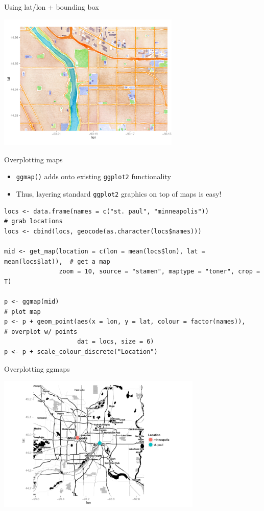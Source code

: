 \documentclass[sans,aspectratio=169,presentation,bigger,fleqn]{beamer}
\begin{document}
\begin{frame}[label=sec-7]{Using lat/lon + bounding box}
\begin{center}
\includegraphics[height=6.5cm]{./plots/ust-coords-box.pdf}
\end{center}
\end{frame}
\begin{frame}[fragile,label=sec-8]{Overplotting maps}
 \begin{itemize}
\item \texttt{ggmap()} adds onto existing \texttt{ggplot2} functionality
\item Thus, layering standard \texttt{ggplot2} graphics on top of maps is easy!
\end{itemize}

\scriptsize
\begin{verbatim}
locs <- data.frame(names = c("st. paul", "minneapolis"))                  # grab locations
locs <- cbind(locs, geocode(as.character(locs$names)))

mid <- get_map(location = c(lon = mean(locs$lon), lat = mean(locs$lat)),  # get a map
               zoom = 10, source = "stamen", maptype = "toner", crop = T)

p <- ggmap(mid)                                                           # plot map
p <- p + geom_point(aes(x = lon, y = lat, colour = factor(names)),        # overplot w/ points
                    dat = locs, size = 6)
p <- p + scale_colour_discrete("Location")
\end{verbatim}

\normalsize
\end{frame}
\begin{frame}[label=sec-9]{Overplotting ggmaps}
\begin{center}
\includegraphics[height=6.5cm]{./plots/ggmap-points.pdf}
\end{center}
\end{frame}
\end{document}
